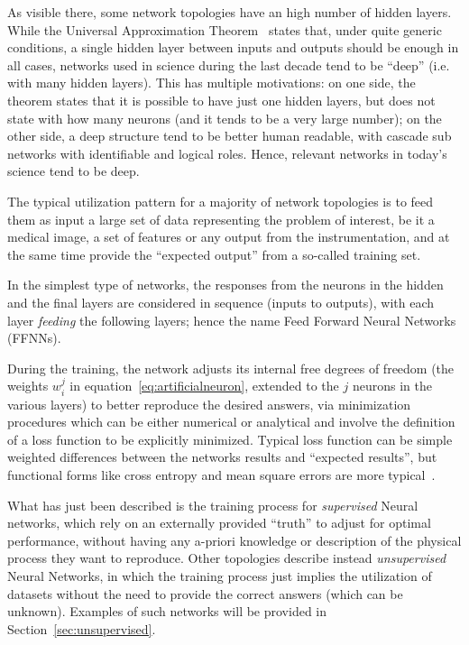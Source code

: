 As visible there, some network topologies have an high number of hidden layers. While the Universal Approximation Theorem~\cite{Hornik1991} states that, under quite generic conditions, a single hidden layer between inputs and outputs should be enough in all cases, networks used in science during the last decade tend to be ``deep'' (i.e. with many hidden layers). This has multiple motivations: on one side, the theorem states that it is possible to have just one hidden layers, but does not state with how many neurons (and it tends to be a very large number); on the other side, a deep structure tend to be better human readable, with cascade sub networks with identifiable and logical roles. Hence, relevant networks in today's science tend to be deep.


The typical utilization pattern for a majority of network topologies is to feed them as input a large set of data representing the problem of interest, be it a medical image, a set of features or any output from the instrumentation, and at the same time provide the ``expected output''
from a so-called training set. 

In the simplest type of networks, the responses from the neurons in the hidden and the final layers are considered in sequence (inputs to outputs), with each layer \emph{feeding} the following layers; hence the name Feed Forward Neural Networks (FFNNs).

During the training, the network adjusts its internal free degrees of freedom (the weights $w_i^j$ in equation~\ref{eq:artificialneuron}, extended to the $j$ neurons in the various layers) to better reproduce the desired answers, via minimization procedures which can be either numerical or analytical and involve the definition of a loss function to be explicitly minimized. Typical loss function can be simple weighted differences between the networks results and ``expected results'', but functional forms like cross entropy and mean square errors are more typical~\cite{Wang2020}.

What has just been described is the training process for \emph{supervised} Neural networks, which rely on an externally provided ``truth'' to adjust for optimal performance, without having any a-priori knowledge or description of the physical process they want to reproduce.
Other topologies describe instead  \emph{unsupervised} Neural Networks, in which the training process just implies the utilization of datasets without the need to provide the correct answers (which can be unknown). Examples of such networks will be provided in Section~\ref{sec:unsupervised}.

